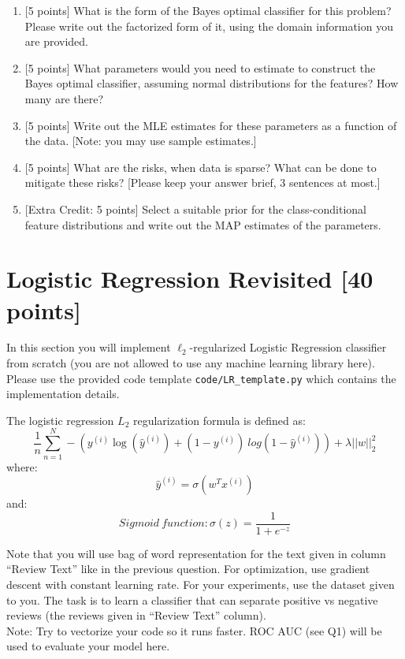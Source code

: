 \documentclass[letterpaper]{article}
\begin{document}
\begin{enumerate}
\item {[5 points]} What is the form of the Bayes optimal classifier for this problem? Please write out the factorized form of it, using the domain information you are provided.
\item {[5 points]} What parameters would you need to estimate to construct the Bayes optimal classifier, assuming normal distributions for the features? How many are there?
\item {[5 points]} Write out the MLE estimates for these parameters as a function of the data. [Note: you may use sample estimates.]
\item {[5 points]} What are the risks, when data is sparse? What can be done to mitigate these risks? [Please keep your answer brief, 3 sentences at most.]
\item {[Extra Credit: 5 points]} Select a suitable prior for the class-conditional feature distributions and write out the MAP estimates of the parameters.
\end{enumerate}



\section{Logistic Regression Revisited [40 points]}
\noindent In this section you will implement $\ell_2$-regularized Logistic Regression classifier from scratch (you are not allowed to use any machine learning library here). Please use the provided code template \texttt{code/LR\_template.py} which contains the implementation details.  

The logistic regression $L_{2}$ regularization formula is defined as: $$\frac{1}{n}\sum_{n=1}^{N} -(y^{(i)} \log(\hat{y}^{(i)})+(1-y^{(i)})\ log(1-\hat{y}^{(i)})) +\lambda ||w||_{2}^{2}$$
where:
$$\hat{y}^{(i)} = \sigma(w^Tx^{(i)})$$
and:
$$ Sigmoid \ function: \sigma(z) = \frac{1}{1 + e^{-z}}$$

Note that you will use bag of word representation for the text given in column ``Review Text'' like in the previous question. For optimization, use gradient descent with constant learning rate. For your experiments, use the dataset given to you. The task is to learn a classifier that can separate positive vs negative reviews (the reviews given in ``Review Text'' column). \\
Note: Try to vectorize your code so it runs faster. ROC AUC (see Q1) will be used to evaluate your model here.
\end{document}
